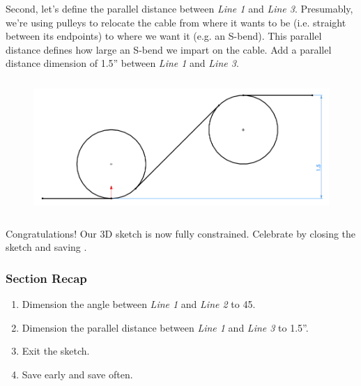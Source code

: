 Second, let's define the parallel distance between \emph{Line 1} and \emph{Line 3}.
Presumably, we're using pulleys to relocate the cable from where it wants to be (i.e.
straight between its endpoints) to where we want it (e.g. an S-bend). This
parallel distance defines how large an S-bend we impart on the cable. Add a
parallel distance dimension of 1.5'' between \emph{Line 1} and \emph{Line 3}.

\begin{figure}[H]
\begin{center}
  \includegraphics[height=2in]{images/figures/s-bend-dimension.png}
\end{center}
\end{figure}

Congratulations! Our 3D sketch is now fully constrained. Celebrate by closing
the sketch and saving .

\subsubsection{Section Recap}

\begin{enumerate}
\item{} Dimension the angle between \emph{Line 1} and \emph{Line 2} to 45\textdegree.
\item{} Dimension the parallel distance between \emph{Line 1} and \emph{Line 3} to 1.5''.
\item{} Exit the sketch.
\item{} Save early and save often.
\end{enumerate}
